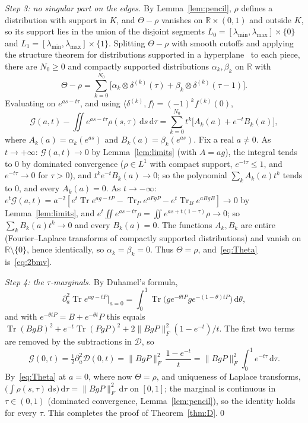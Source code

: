 \documentclass[11pt]{amsart}
\theoremstyle{definition}
\theoremstyle{remark}
\numberwithin{equation}{section}
\newcommand{\R}{\mathbb{R}}
\newcommand{\Tr}{\operatorname{Tr}}
\newcommand{\ip}[2]{\langle #1,#2\rangle}
\newcommand{\cD}{\mathcal{D}}
\newcommand{\cG}{\mathcal{G}}
\newcommand{\lmin}{\lambda_{\min}}
\newcommand{\lmax}{\lambda_{\max}}
\newcommand{\dd}{\,\mathrm{d}}
\begin{document}
\emph{Step 3: no singular part on the edges.} By Lemma~\ref{lem:pencil}, $\rho$ defines a distribution with support in
$K$, and $\Theta-\rho$ vanishes on $\R\times(0,1)$ and outside $K$, so its support lies in the union of the disjoint
segments $L_0=[\lmin,\lmax]\times\{0\}$ and $L_1=[\lmin,\lmax]\times\{1\}$. Splitting $\Theta-\rho$ with smooth cutoffs
and applying the structure theorem for distributions supported in a hyperplane~\cite[Theorem~2.3.5]{Hormander} to
each piece, there are $N_0\ge0$ and compactly supported distributions $\alpha_k,\beta_k$ on $\R$ with
\[
\Theta-\rho=\sum_{k=0}^{N_0}\bigl[\alpha_k\otimes\delta^{(k)}(\tau)+\beta_k\otimes\delta^{(k)}(\tau-1)\bigr].
\]
Evaluating on $e^{as-t\tau}$, and using $\ip{\delta^{(k)}}f=(-1)^kf^{(k)}(0)$,
\[
\cG(a,t)-\iint e^{as-t\tau}\rho(s,\tau)\dd s\dd\tau=\sum_{k=0}^{N_0}t^k\bigl[A_k(a)+e^{-t}B_k(a)\bigr],
\]
where $A_k(a)=\alpha_k(e^{as})$ and $B_k(a)=\beta_k(e^{as})$. Fix a real $a\ne0$. As $t\to+\infty$: $\cG(a,t)\to0$ by Lemma~\ref{lem:limits} (with $A=ag$), the integral tends to $0$ by
dominated convergence ($\rho\in L^1$ with compact support, $e^{-t\tau}\le1$, and $e^{-t\tau}\to0$ for $\tau>0$), and
$t^ke^{-t}B_k(a)\to0$; so the polynomial $\sum_kA_k(a)t^k$ tends to $0$, and every $A_k(a)=0$. As $t\to-\infty$:
$e^t\cG(a,t)=a^{-2}[e^t\Tr e^{ag-tP}-\Tr_Pe^{aPgP}-e^t\Tr_Be^{aBgB}]\to0$ by Lemma~\ref{lem:limits}, and
$e^t\iint e^{as-t\tau}\rho=\iint e^{as+t(1-\tau)}\rho\to0$; so $\sum_kB_k(a)t^k\to0$ and every $B_k(a)=0$. The functions
$A_k,B_k$ are entire (Fourier--Laplace transforms of compactly supported distributions) and vanish on
$\R\setminus\{0\}$, hence identically, so $\alpha_k=\beta_k=0$. Thus $\Theta=\rho$, and~\eqref{eq:Theta}
is~\eqref{eq:2bmv}.

\emph{Step 4: the $\tau$-marginals.} By Duhamel's formula,
\[
\partial_a^2\Tr e^{ag-tP}\big|_{a=0}=\int_0^1\Tr\bigl(ge^{-\theta tP}ge^{-(1-\theta)tP}\bigr)\dd\theta ,
\]
and with $e^{-\theta tP}=B+e^{-\theta t}P$ this equals $\Tr(BgB)^2+e^{-t}\Tr(PgP)^2+2\|BgP\|_F^2(1-e^{-t})/t$. The first two
terms are removed by the subtractions in $\cD$, so
\[
\cG(0,t)=\tfrac12\partial_a^2\cD(0,t)=\|BgP\|_F^2\,\frac{1-e^{-t}}t=\|BgP\|_F^2\int_0^1e^{-t\tau}\dd\tau .
\]
By~\eqref{eq:Theta} at $a=0$, where now $\Theta=\rho$, and uniqueness of Laplace transforms,
$\bigl(\int\rho(s,\tau)\dd s\bigr)\dd\tau=\|BgP\|_F^2\dd\tau$ on $[0,1]$; the
marginal is continuous in $\tau\in(0,1)$ (dominated convergence, Lemma~\ref{lem:pencil}), so the identity holds for every
$\tau$. This completes the proof of Theorem~\ref{thm:D}.\qed
\end{document}
